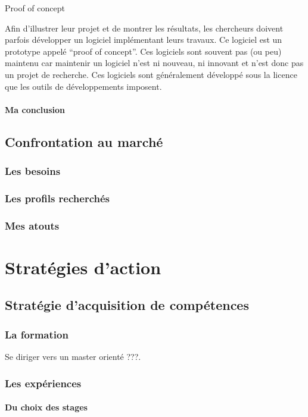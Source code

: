 \documentclass[a4paper,12pt, draft]{report}
\begin{document}
\subparagraph{Proof of concept}
Afin d'illustrer leur projet et de montrer les résultats, les chercheurs doivent parfois développer un logiciel implémentant leurs travaux. Ce logiciel est un prototype appelé ``proof of concept''. Ces logiciels sont souvent pas (ou peu) maintenu car maintenir un logiciel n'est ni nouveau, ni innovant et n'est donc pas un projet de recherche. Ces logiciels sont généralement développé sous la licence que les outils de développements imposent.


\subsection{Ma conclusion}


\chapter{Confrontation au marché}
\section{Les besoins}
\section{Les profils recherchés}
\section{Mes atouts}

\part{Stratégies d'action}

\chapter{Stratégie d'acquisition de compétences}
\section{La formation}
Se diriger vers un master orienté ???.
\section{Les expériences}
\subsection{Du choix des stages}
\end{document}

